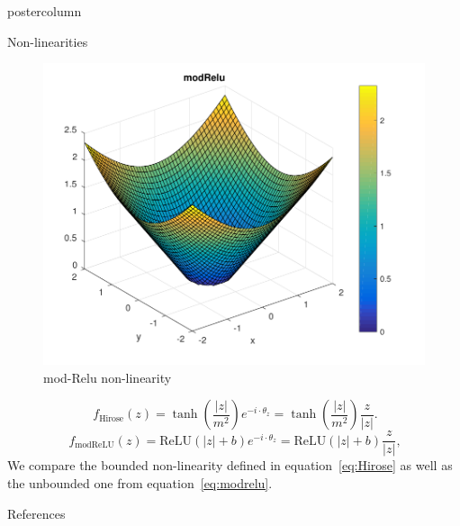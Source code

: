 \documentclass{beamer}
\begin{document}
\begin{frame}
\begin{columns}
\begin{column}{.43\textwidth}
\begin{beamercolorbox}[center]{postercolumn}
\begin{minipage}{.98\textwidth}
{\begin{myblock}{Non-linearities}
\begin{figure}
\begin{minipage}{0.43\textwidth}
                                    \caption{Hirose non-linearity}
                                \end{minipage}
                                \hspace{1em}
                                \begin{minipage}{0.45\textwidth}
                                    \centering\includegraphics[width=1.0\textwidth]{img/modRelu_slice}
                                    \caption{mod-Relu non-linearity}
                                \end{minipage}
                            \end{figure}
                            \begin{equation}~\label{eq:Hirose}
                                        f_{\text{Hirose}}(z) = \tanh\left(\frac{|z|}{m^2}\right)e^{-i \cdot \theta_z} = \tanh\left(\frac{|z|}{m^2}\right)\frac{z}{|z|}.
                            \end{equation} 
                            \begin{equation}~\label{eq:modrelu}
                                        f_{\text{modReLU}}(z) = \text{ReLU}(|z| + b)e^{-i \cdot \theta_z} = \text{ReLU}(|z| + b)\frac{z}{|z|},
                            \end{equation}
                            We compare the bounded non-linearity defined in equation~\ref{eq:Hirose} as well as the unbounded one from equation~\ref{eq:modrelu}.
                    \end{myblock}\vfill
                    \begin{myblock}{References}
                        \footnotesize
                        
                        
                    \end{myblock}\vfill

}
\end{minipage}
\end{beamercolorbox}
\end{column}
\end{columns}
\end{frame}
\end{document}

